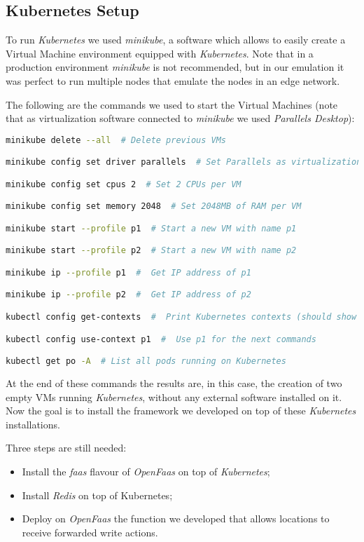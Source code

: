 \subsection{Kubernetes Setup}
To run \textit{Kubernetes} we used \textit{minikube}, a software which allows to easily create a Virtual Machine environment equipped with \textit{Kubernetes}. Note that in a production environment \textit{minikube} is not recommended, but in our emulation it was perfect to run multiple nodes that emulate the nodes in an edge network.

The following are the commands we used to start the Virtual Machines (note that as virtualization software connected to \textit{minikube} we used \textit{Parallels Desktop}):
\begin{lstlisting}[language=bash]
minikube delete --all  # Delete previous VMs

minikube config set driver parallels  # Set Parallels as virtualization software

minikube config set cpus 2  # Set 2 CPUs per VM

minikube config set memory 2048  # Set 2048MB of RAM per VM

minikube start --profile p1  # Start a new VM with name p1

minikube start --profile p2  # Start a new VM with name p2

minikube ip --profile p1  #  Get IP address of p1

minikube ip --profile p2  #  Get IP address of p2

kubectl config get-contexts  #  Print Kubernetes contexts (should show two Kubernetes machines, p1 and p2)

kubectl config use-context p1  #  Use p1 for the next commands

kubectl get po -A  # List all pods running on Kubernetes
\end{lstlisting}

At the end of these commands the results are, in this case, the creation of two empty VMs running \textit{Kubernetes}, without any external software installed on it.
Now the goal is to install the framework we developed on top of these \textit{Kubernetes} installations.

Three steps are still needed:
\begin{itemize}
    \item Install the \textit{faas} flavour of \textit{OpenFaas} on top of \textit{Kubernetes};
    \item Install \textit{Redis} on top of Kubernetes;
    \item Deploy on \textit{OpenFaas} the function we developed that allows locations to receive forwarded write actions.
\end{itemize}


